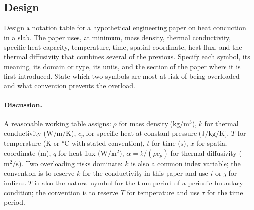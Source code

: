 \subsection*{Design}

\begin{exercise}
Design a notation table for a hypothetical engineering paper on heat
conduction in a slab. The paper uses, at minimum, mass density,
thermal conductivity, specific heat capacity, temperature, time,
spatial coordinate, heat flux, and the thermal diffusivity that
combines several of the previous. Specify each symbol, its meaning,
its domain or type, its units, and the section of the paper where
it is first introduced. State which two symbols are most at risk of
being overloaded and what convention prevents the overload.

\paragraph{Discussion.}
A reasonable working table assigns: $\rho$ for mass density
($\si{\kilogram\per\meter\cubed}$), $k$ for thermal conductivity
($\si{\watt\per\meter\per\kelvin}$), $c_{p}$ for specific heat at
constant pressure ($\si{\joule\per\kilogram\per\kelvin}$), $T$ for
temperature ($\si{\kelvin}$ or $\si{\degreeCelsius}$ with stated
convention), $t$ for time ($\si{\second}$), $x$ for spatial
coordinate ($\si{\meter}$), $q$ for heat flux ($\si{\watt\per\meter
\squared}$), $\alpha = k / (\rho c_{p})$ for thermal diffusivity
($\si{\meter\squared\per\second}$). Two overloading risks dominate:
$k$ is also a common index variable; the convention is to reserve
$k$ for the conductivity in this paper and use $i$ or $j$ for
indices. $T$ is also the natural symbol for the time period of a
periodic boundary condition; the convention is to reserve $T$ for
temperature and use $\tau$ for the time period.
\end{exercise}

